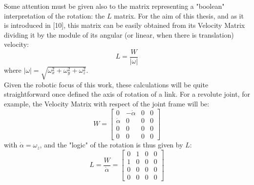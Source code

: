 \documentclass[a4paper,12pt,oneside]{report}
\begin{document}
Some attention must be given also to the matrix representing a "boolean" interpretation of the rotation: the $L$ matrix. For the aim of this thesis, and as it is introduced in [10], this matrix can be easily obtained from its Velocity Matrix dividing it by the module of its angular (or linear, when there is translation) velocity:
\begin{equation}
  L=\frac{W}{|\omega|}
  \label{L_matrix}
\end{equation}
where $|\omega|=\sqrt{\omega_x^2+\omega_y^2+\omega_z^2}$.\\
Given the robotic focus of this work, these calculations will be quite straightforward once defined the axis of rotation of a link. For a revolute joint, for example, the Velocity Matrix with respect of the joint frame will be:
\begin{equation}
  W=\begin{bmatrix}
    0&-\dot{\alpha}&0&0\\
    \dot{\alpha}&0&0&0\\
    0&0&0&0\\
    0&0&0&0
  \end{bmatrix}
\end{equation}
with $\dot{\alpha}=\omega_z$, and the "logic" of the rotation is thus given by $L$:
\begin{equation}
  L=\frac{W}{\dot{\alpha}}=\begin{bmatrix}
    0&1&0&0\\
    1&0&0&0\\
    0&0&0&0\\
    0&0&0&0
  \end{bmatrix}
  \label{L_matrix}
\end{equation}
\newpage
\end{document}
